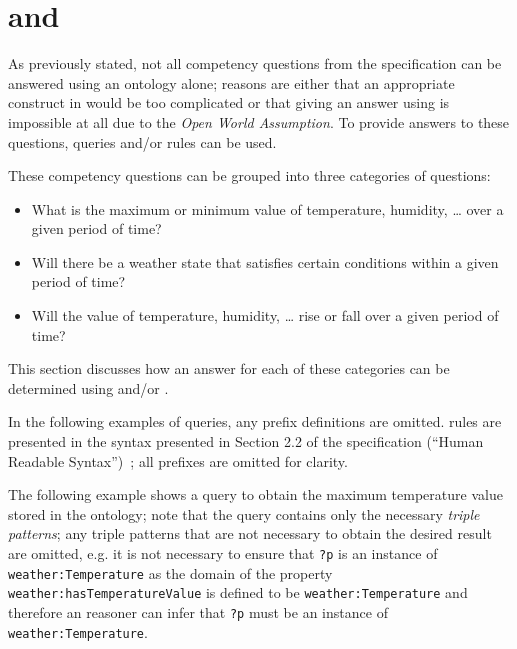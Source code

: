 \section{ and }
\label{sec:queries_rules}

As previously stated, not all competency questions from the specification can be answered using an  ontology alone; reasons are either that an appropriate construct in  would be too complicated or that giving an answer using  is impossible at all due to the \emph{Open World Assumption}. To provide answers to these questions,  queries and/or  rules can be used.

These competency questions can be grouped into three categories of questions:
\begin{itemize}
  \item What is the maximum or minimum value of temperature, humidity, … over a given period of time?
  \item Will there be a weather state that satisfies certain conditions within a given period of time?
  \item Will the value of temperature, humidity, … rise or fall over a given period of time?
\end{itemize}

This section discusses how an answer for each of these categories can be determined using  and/or .

In the following examples of  queries, any prefix definitions are omitted.  rules are presented in the syntax presented in Section 2.2 of the  specification (``Human Readable Syntax'')~\cite{SWRL}; all prefixes are omitted for clarity.

The following example shows a  query to obtain the maximum temperature value stored in the ontology; note that the query contains only the necessary \emph{triple patterns}; any triple patterns that are not necessary to obtain the desired result are omitted, e.g. it is not necessary to ensure that \texttt{?p} is an instance of \texttt{weather:Temperature} as the domain of the property \texttt{weather:hasTemperatureValue} is defined to be \texttt{weather:Temperature} and therefore an  reasoner can infer that \texttt{?p} must be an instance of \texttt{weather:Temperature}.

